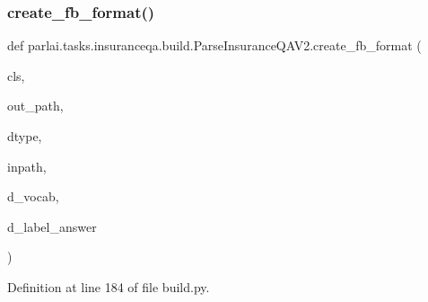 \subsubsection{\texorpdfstring{create\+\_\+fb\+\_\+format()}{create\_fb\_format()}}
{\footnotesize\ttfamily def parlai.\+tasks.\+insuranceqa.\+build.\+Parse\+Insurance\+Q\+A\+V2.\+create\+\_\+fb\+\_\+format (\begin{DoxyParamCaption}\item[{}]{cls,  }\item[{}]{out\+\_\+path,  }\item[{}]{dtype,  }\item[{}]{inpath,  }\item[{}]{d\+\_\+vocab,  }\item[{}]{d\+\_\+label\+\_\+answer }\end{DoxyParamCaption})}



Definition at line 184 of file build.\+py.


